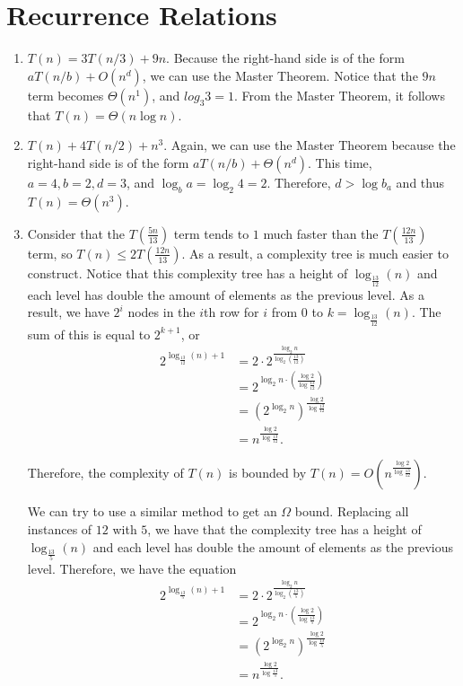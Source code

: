 \documentclass{article}
\begin{document}
\section{Recurrence Relations}
\begin{enumerate}[label=\alph*)]
	\item $T(n) = 3T(n/3) + 9n$. Because the right-hand side is of the form $aT(n/b) + O(n^d)$, we can use the Master Theorem. Notice that the $9n$ term becomes $\Theta(n^1)$, and $log_3 3 = 1$. From the Master Theorem, it follows that $\boxed{T(n) = \Theta(n \log n)}$.
	\item $T(n) + 4T(n/2) + n^3$. Again, we can use the Master Theorem because the right-hand side is of the form $aT(n/b) + \Theta(n^d)$. This time, $a = 4, b = 2, d = 3$, and $\log_b a = \log_2 4 = 2$. Therefore, $d > \log b_a$ and thus $\boxed{T(n) = \Theta(n^3)}$.
	\item Consider that the $T\left(\frac{5n}{13}\right)$ term tends to $1$ much faster than the $T\left(\frac{12n}{13}\right)$ term, so $T(n) \leq 2T \left(\frac{12n}{13}\right)$. As a result, a complexity tree is much easier to construct. Notice that this complexity tree has a height of $\log_{\frac{13}{12}}(n)$ and each level has double the amount of elements as the previous level. As a result, we have $2^i$ nodes in the $i$th row for $i$ from $0$ to $k = \log_{\frac{13}{12}}(n)$. The sum of this is equal to $2^{k + 1}$, or 
	\begin{align*}
		2^{\log_{\frac{13}{12}}(n) + 1} &= 2 \cdot 2^{\frac{\log_2 n}{\log_2 \left(\frac{13}{12}\right)}} \\
		&= 2^{\log_2 n \cdot (\frac{\log 2}{\log \frac{13}{12}})} \\
		&= \left(2^{\log_2 n}\right)^\frac{\log 2}{\log \frac{13}{12}} \\
		&= n^{\frac{\log 2}{\log \frac{13}{12}}}.
	\end{align*}
		
	Therefore, the complexity of $T(n)$ is bounded by $T(n) = \boxed{O(n^{\frac{\log 2}{\log \frac{13}{12}}})}$.

	We can try to use a similar method to get an $\Omega$ bound. Replacing all instances of $12$ with $5$, we have that the complexity tree has a height of $\log_{\frac{13}{5}}(n)$ and each level has double the amount of elements as the previous level. Therefore, we have the equation
	\begin{align*}
		2^{\log_{\frac{13}{5}}(n) + 1} &= 2 \cdot 2^{\frac{\log_2 n}{\log_2 \left(\frac{13}{5}\right)}} \\
		&= 2^{\log_2 n \cdot (\frac{\log 2}{\log \frac{13}{5}})} \\
		&= \left(2^{\log_2 n}\right)^\frac{\log 2}{\log \frac{13}{5}} \\
		&= n^{\frac{\log 2}{\log \frac{13}{5}}}.
	\end{align*}


\end{enumerate}
\end{document}
